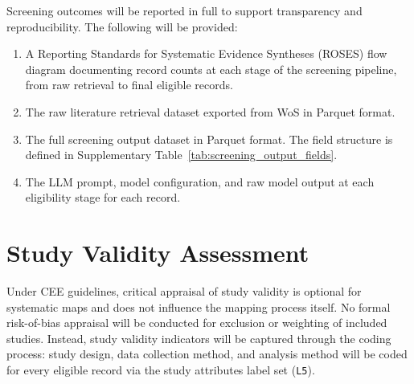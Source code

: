 \documentclass[12pt]{article}
\begin{document}

Screening outcomes will be reported in full to support transparency and reproducibility. The following will be provided:

\begin{enumerate}[leftmargin=*]
\item A Reporting Standards for Systematic Evidence Syntheses (ROSES) flow diagram documenting record counts at each stage of the screening pipeline, from raw retrieval to final eligible records.

\item The raw literature retrieval dataset exported from WoS in Parquet format.

\item The full screening output dataset in Parquet format. The field structure is defined in Supplementary Table~\ref{tab:screening_output_fields}.

\item The LLM prompt, model configuration, and raw model output at each eligibility stage for each record.
\end{enumerate}

\section*{Study Validity Assessment}
% 
Under CEE guidelines, critical appraisal of study validity is optional for systematic maps and does not influence the mapping process itself. No formal risk-of-bias appraisal will be conducted for exclusion or weighting of included studies. Instead, study validity indicators will be captured through the coding process: study design, data collection method, and analysis method will be coded for every eligible record via the study attributes label set (\texttt{L5}).
\end{document}
